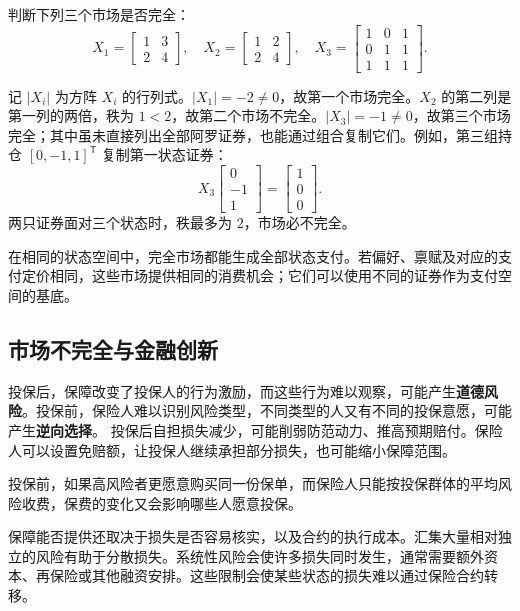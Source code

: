 \begin{tcolorbox}[example,title=课堂例题：三组支付矩阵的完全性]
\begin{question}
判断下列三个市场是否完全：
\[
 X_1=\begin{bmatrix}1&3\\2&4\end{bmatrix},\quad
 X_2=\begin{bmatrix}1&2\\2&4\end{bmatrix},\quad
 X_3=\begin{bmatrix}1&0&1\\0&1&1\\1&1&1\end{bmatrix}.
\]
\end{question}
\begin{solution}
记 $\lvert X_i\rvert$ 为方阵 $X_i$ 的行列式。$\lvert X_1\rvert=-2\ne0$，故第一个市场完全。$X_2$ 的第二列是第一列的两倍，秩为 $1<2$，故第二个市场不完全。$\lvert X_3\rvert=-1\ne0$，故第三个市场完全；其中虽未直接列出全部阿罗证券，也能通过组合复制它们。例如，第三组持仓 $[0,-1,1]^{\mathsf T}$ 复制第一状态证券：
\[
 X_3\begin{bmatrix}0\\-1\\1\end{bmatrix}
 =\begin{bmatrix}1\\0\\0\end{bmatrix}.
\]
两只证券面对三个状态时，秩最多为 $2$，市场必不完全。
\end{solution}
\end{tcolorbox}

在相同的状态空间中，完全市场都能生成全部状态支付。若偏好、禀赋及对应的支付定价相同，这些市场提供相同的消费机会；它们可以使用不同的证券作为支付空间的基底。

\subsection{市场不完全与金融创新}
\label{sec:wj-three-insurance}
\begin{tcolorbox}[knowledge,title=道德风险与逆向选择]
投保后，保障改变了投保人的行为激励，而这些行为难以观察，可能产生\textbf{道德风险}。投保前，保险人难以识别风险类型，不同类型的人又有不同的投保意愿，可能产生\textbf{逆向选择}。
\tcbline
投保后自担损失减少，可能削弱防范动力、推高预期赔付。保险人可以设置免赔额，让投保人继续承担部分损失，也可能缩小保障范围。

投保前，如果高风险者更愿意购买同一份保单，而保险人只能按投保群体的平均风险收费，保费的变化又会影响哪些人愿意投保。

保障能否提供还取决于损失是否容易核实，以及合约的执行成本。汇集大量相对独立的风险有助于分散损失。系统性风险会使许多损失同时发生，通常需要额外资本、再保险或其他融资安排。这些限制会使某些状态的损失难以通过保险合约转移。
\end{tcolorbox}

